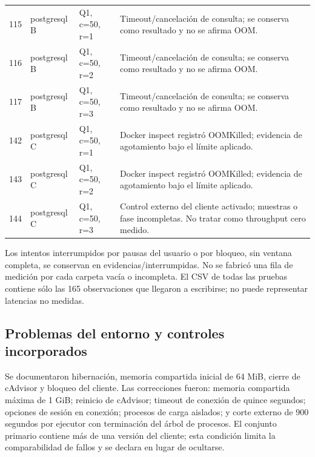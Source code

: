\documentclass[11pt,letterpaper]{article}
\begin{document}
{\begin{longtable}{r>{\raggedright\arraybackslash}p{3cm}>{\raggedright\arraybackslash}p{2.7cm}>{\raggedright\arraybackslash}p{6.5cm}}
115 & postgresql B & Q1, c=50, r=1 & Timeout/cancelación de consulta; se conserva como resultado y no se afirma OOM.\\
116 & postgresql B & Q1, c=50, r=2 & Timeout/cancelación de consulta; se conserva como resultado y no se afirma OOM.\\
117 & postgresql B & Q1, c=50, r=3 & Timeout/cancelación de consulta; se conserva como resultado y no se afirma OOM.\\
142 & postgresql C & Q1, c=50, r=1 & Docker inspect registró OOMKilled; evidencia de agotamiento bajo el límite aplicado.\\
143 & postgresql C & Q1, c=50, r=2 & Docker inspect registró OOMKilled; evidencia de agotamiento bajo el límite aplicado.\\
144 & postgresql C & Q1, c=50, r=3 & Control externo del cliente activado; muestras o fase incompletas. No tratar como throughput cero medido.\\
\end{longtable}}
Los intentos interrumpidos por pausas del usuario o por bloqueo, sin ventana completa, se conservan en evidencias/interrumpidas. No se fabricó una fila de medición por cada carpeta vacía o incompleta. El CSV de todas las pruebas contiene sólo las 165 observaciones que llegaron a escribirse; no puede representar latencias no medidas.
\subsection{Problemas del entorno y controles incorporados}
Se documentaron hibernación, memoria compartida inicial de 64 MiB, cierre de cAdvisor y bloqueo del cliente. Las correcciones fueron: memoria compartida máxima de 1 GiB; reinicio de cAdvisor; timeout de conexión de quince segundos; opciones de sesión en conexión; procesos de carga aislados; y corte externo de 900 segundos por ejecutor con terminación del árbol de procesos. El conjunto primario contiene más de una versión del cliente; esta condición limita la comparabilidad de fallos y se declara en lugar de ocultarse.
\end{document}
